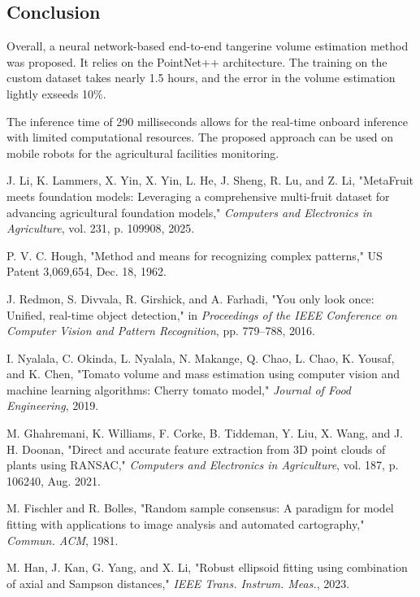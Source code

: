 \begin{thebibliography}{12}
\section{Conclusion}

Overall, a neural network-based end-to-end tangerine volume estimation method was proposed.
It relies on the PointNet++ architecture.
The training on the custom dataset takes nearly 1.5 hours, and the error in the volume estimation lightly exseeds 10$\%$.

The inference time of 290 milliseconds allows for the real-time onboard inference with limited computational resources.
The proposed approach can be used on mobile robots for the agricultural facilities monitoring.

\begin{thebibliography}{10}
J. Li, K. Lammers, X. Yin, X. Yin, L. He, J. Sheng, R. Lu, and Z. Li,  
"MetaFruit meets foundation models: Leveraging a comprehensive multi-fruit dataset for advancing agricultural foundation models,"  
\textit{Computers and Electronics in Agriculture}, vol. 231, p. 109908, 2025.  

 P. V. C. Hough,  
"Method and means for recognizing complex patterns,"  
US Patent 3,069,654, Dec. 18, 1962.

J. Redmon, S. Divvala, R. Girshick, and A. Farhadi,  
"You only look once: Unified, real-time object detection,"  
in \textit{Proceedings of the IEEE Conference on Computer Vision and Pattern Recognition}, pp. 779--788, 2016.  

 I. Nyalala, C. Okinda, L. Nyalala, N. Makange, Q. Chao, L. Chao, K. Yousaf, and K. Chen, "Tomato volume and mass estimation using computer vision and machine learning algorithms: Cherry tomato model," \textit{Journal of Food Engineering}, 2019.

 M. Ghahremani, K. Williams, F. Corke, B. Tiddeman, Y. Liu, X. Wang, and J. H. Doonan, "Direct and accurate feature extraction from 3D point clouds of plants using RANSAC," \textit{Computers and Electronics in Agriculture}, vol. 187, p. 106240, Aug. 2021.

 M. Fischler and R. Bolles, "Random sample consensus: A paradigm for model fitting with applications to image analysis and automated cartography," \textit{Commun. ACM}, 1981.

 M. Han, J. Kan, G. Yang, and X. Li, "Robust ellipsoid fitting using combination of axial and Sampson distances," \textit{IEEE Trans. Instrum. Meas.}, 2023.


\end{thebibliography}
\end{thebibliography}
